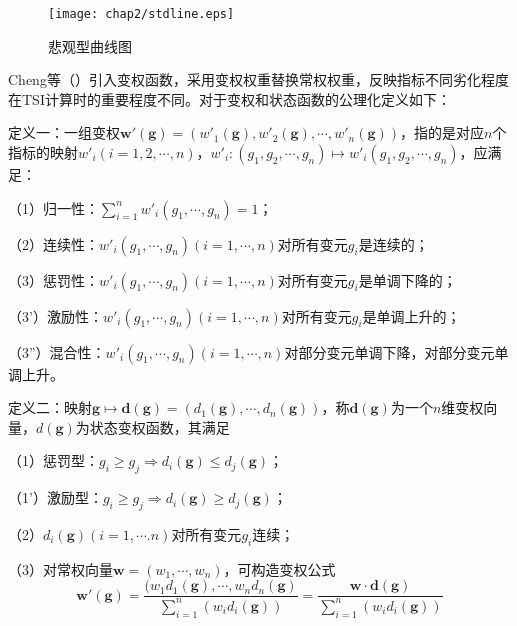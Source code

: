 \begin{figure}[htb!]
    \centering
    \texttt{[image: chap2/stdline.eps]}
    \caption{悲观型曲线图}
    \label{fig:悲观型曲线图}
\end{figure}

Cheng等（\citeyear{cheng1999evaluating}）引入变权函数，采用变权权重替换常权权重，反映指标不同劣化程度在TSI计算时的重要程度不同。对于变权和状态函数的公理化定义如下：

定义一：一组变权$\mathbf{{w}'}(\mathbf{g})=\left( {{{{w}'}}_{1}}(\mathbf{g}),{{{{w}'}}_{2}}(\mathbf{g}),\cdots ,{{{{w}'}}_{n}}(\mathbf{g}) \right)$，指的是对应$n$个指标的映射${{{w}'}_{i}}(i=1,2,\cdots ,n)$，${{{w}'}_{i}}:({{g}_{1}},{{g}_{2}},\cdots ,{{g}_{n}})\mapsto {{{w}'}_{i}}({{g}_{1}},{{g}_{2}},\cdots ,{{g}_{n}})$，应满足：

（1）归一性：$\sum\limits_{i=1}^{n}{{{{{w}'}}_{i}}({{g}_{1}},\cdots ,{{g}_{n}})=1}$；

（2）连续性：${{{w}'}_{i}}({{g}_{1}},\cdots ,{{g}_{n}})(i=1,\cdots ,n)$对所有变元$g_i$是连续的；

（3）惩罚性：${{{w}'}_{i}}({{g}_{1}},\cdots ,{{g}_{n}})(i=1,\cdots ,n)$对所有变元$g_i$是单调下降的；

（3'）激励性：${{{w}'}_{i}}({{g}_{1}},\cdots ,{{g}_{n}})(i=1,\cdots ,n)$对所有变元$g_i$是单调上升的；

（3''）混合性：${{{w}'}_{i}}({{g}_{1}},\cdots ,{{g}_{n}})(i=1,\cdots ,n)$对部分变元单调下降，对部分变元单调上升。

定义二：映射$\mathbf{g}\mapsto \mathbf{d}(\mathbf{g})=({{d}_{1}}(\mathbf{g}),\cdots ,{{d}_{n}}(\mathbf{g}))$，称$\mathbf{d}(\mathbf{g})$为一个$n$维变权向量，${d}(\mathbf{g})$为状态变权函数，其满足

（1）惩罚型：${{g}_{i}}\ge {{g}_{j}}\Rightarrow {{d}_{i}}(\mathbf{g})\le {{d}_{j}}(\mathbf{g})$；

（1'）激励型：${{g}_{i}}\ge {{g}_{j}}\Rightarrow {{d}_{i}}(\mathbf{g})\ge {{d}_{j}}(\mathbf{g})$；

（2）${{d}_{i}}(\mathbf{g})(i=1,\cdots .n)$对所有变元$g_i$连续；

（3）对常权向量$\mathbf{w}=({{w}_{1}},\cdots ,{{w}_{n}})$，可构造变权公式
\begin{equation}
    \label{equ:状态变权函数}
    \mathbf{{w}'}(\mathbf{g})=\frac{({{w}_{1}}{{d}_{1}}(\mathbf{g}),\cdots ,{{w}_{n}}{{d}_{n}}(\mathbf{g})}{\sum\limits_{i=1}^{n}{({{w}_{i}}{{d}_{i}}(\mathbf{g}))}}=\frac{\mathbf{w}\cdot \mathbf{d}(\mathbf{g})}{\sum\limits_{i=1}^{n}{({{w}_{i}}{{d}_{i}}(\mathbf{g}))}}
\end{equation}

